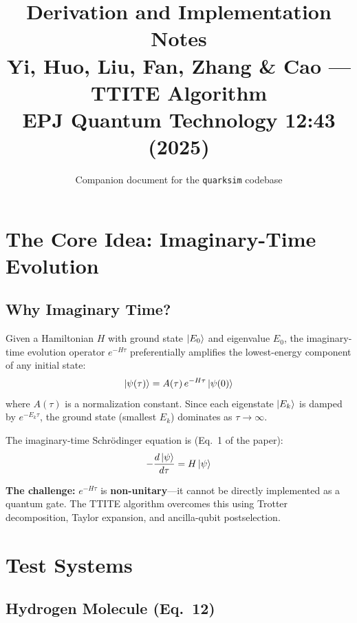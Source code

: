 \documentclass[11pt,a4paper]{article}
\title{Derivation and Implementation Notes\\
\large Yi, Huo, Liu, Fan, Zhang \& Cao --- TTITE Algorithm\\
\normalsize EPJ Quantum Technology 12:43 (2025)}
\author{Companion document for the \texttt{quarksim} codebase}
\date{}
\begin{document}
\maketitle

\tableofcontents
\newpage

\section{The Core Idea: Imaginary-Time Evolution}

\subsection{Why Imaginary Time?}

Given a Hamiltonian $H$ with ground state $\ket{E_0}$ and eigenvalue $E_0$, the imaginary-time evolution operator $e^{-H\tau}$ preferentially amplifies the lowest-energy component of any initial state:
\begin{equation}
  \ket{\psi(\tau)} = A(\tau)\, e^{-H\tau}\ket{\psi(0)}
  \label{eq:ite}
\end{equation}
where $A(\tau)$ is a normalization constant. Since each eigenstate $\ket{E_k}$ is damped by $e^{-E_k \tau}$, the ground state (smallest $E_k$) dominates as $\tau \to \infty$.

The imaginary-time Schr\"odinger equation is (Eq.~1 of the paper):
\begin{equation}
  -\frac{d\ket{\psi}}{d\tau} = H\ket{\psi}
  \label{eq:ite_schrodinger}
\end{equation}

\textbf{The challenge:} $e^{-H\tau}$ is \textbf{non-unitary}---it cannot be directly implemented as a quantum gate. The TTITE algorithm overcomes this using Trotter decomposition, Taylor expansion, and ancilla-qubit postselection.


\section{Test Systems}

\subsection{Hydrogen Molecule (Eq.~12)}
\end{document}
